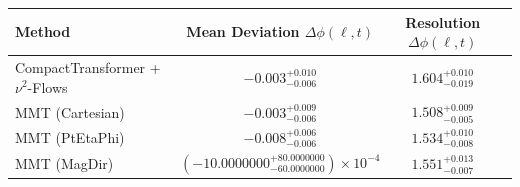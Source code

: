     \begin{tabular}{lccc}
        \toprule
        Method & Mean Deviation $\Delta\phi(\ell, t)$ & Resolution $\Delta\phi(\ell, t)$ \\
        \midrule
        CompactTransformer + $\nu^2$-Flows & $-0.003^{+0.010}_{-0.006}$ & $1.604^{+0.010}_{-0.019}$ \\
        MMT (Cartesian) & $-0.003^{+0.009}_{-0.006}$ & $1.508^{+0.009}_{-0.005}$ \\
        MMT (PtEtaPhi) & $-0.008^{+0.006}_{-0.006}$ & $1.534^{+0.010}_{-0.008}$ \\
        MMT (MagDir) & $(-10.0000000^{+80.0000000}_{-60.0000000})\times 10^{-4}$ & $1.551^{+0.013}_{-0.007}$ \\
        \bottomrule
    \end{tabular}